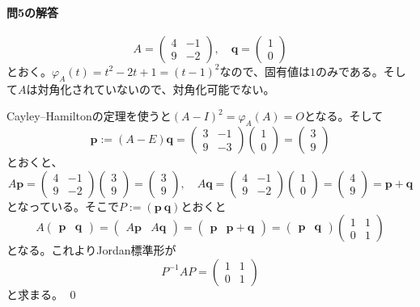 \paragraph{問5の解答}

\[
A = 
\begin{pmatrix}
4 & -1 \\
9 & -2
\end{pmatrix}, \quad
\bm{q} = 
\begin{pmatrix}
1 \\
0 
\end{pmatrix}
\]
とおく。$\varphi_A(t) = t^2 - 2t + 1 = (t - 1)^2$なので、固有値は$1$のみである。そして$A$は対角化されていないので、対角化可能でない。

Cayley--Hamiltonの定理を使うと$(A - I)^2 = \varphi_A(A) = O$となる。そして
\[
\bm{p} := (A - E) \bm{q}
=
\begin{pmatrix}
3 & -1 \\
9 & -3
\end{pmatrix}
\begin{pmatrix}
1 \\
0 
\end{pmatrix}
=
\begin{pmatrix}
3 \\
9
\end{pmatrix}
\]
とおくと、
\[
A\bm{p} =
\begin{pmatrix}
4 & -1 \\
9 & -2
\end{pmatrix}
\begin{pmatrix}
3 \\
9
\end{pmatrix}
=
\begin{pmatrix}
3 \\
9
\end{pmatrix}, \quad
A\bm{q} = 
\begin{pmatrix}
4 & -1 \\
9 & -2
\end{pmatrix}
\begin{pmatrix}
1 \\
0 
\end{pmatrix}
=
\begin{pmatrix}
4 \\
9
\end{pmatrix}
= \bm{p} + \bm{q}
\]
となっている。そこで$P := (\bm{p} \ \bm{q})$とおくと
\[
A
\begin{pmatrix}
\bm{p} & \bm{q}
\end{pmatrix}
=
\begin{pmatrix}
A\bm{p} & A\bm{q}
\end{pmatrix}
=
\begin{pmatrix}
\bm{p} & \bm{p} + \bm{q}
\end{pmatrix}
=
\begin{pmatrix}
\bm{p} & \bm{q}
\end{pmatrix}
\begin{pmatrix}
1 & 1 \\
0 & 1
\end{pmatrix}
\]
となる。これよりJordan標準形が
\[
P^{-1} A P =
\begin{pmatrix}
1 & 1 \\
0 & 1
\end{pmatrix}
\]
と求まる。 \qed


